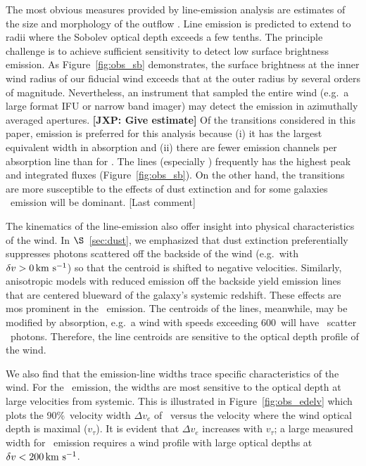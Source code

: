 \documentclass[12pt,preprint]{aastex}
\begin{document}
The most obvious measures provided by line-emission analysis are
estimates
of the size and morphology of the outflow \citep{rubin+10c}.  
Line emission is predicted to extend to radii where the Sobolev
optical depth exceeds a few tenths.  The principle
challenge is to achieve sufficient sensitivity to detect low
surface brightness emission. As Figure~\ref{fig:obs_sb}
demonstrates, the surface brightness at the inner wind radius of our
fiducial wind exceeds that at the outer radius by several orders of magnitude.
Nevertheless, an instrument that sampled the entire wind (e.g.\ a
large format IFU or narrow band imager) may detect the emission in
azimuthally averaged apertures. {\bf [JXP: Give estimate]}
Of the transitions considered in this paper,  emission is
preferred for this analysis because 
(i) it has the largest equivalent width in absorption and
(ii) there are fewer emission channels per absorption line than for
.  The  lines (especially \mgiib) frequently has the
highest peak and integrated fluxes (Figure~\ref{fig:obs_sb}).  
On the other hand, the  transitions are more susceptible to
the effects of dust extinction and for some galaxies \feiis\ emission
will be dominant.  [Last comment]

The kinematics of the line-emission also offer insight into physical
characteristics of the wind.
In $\S$~\ref{sec:dust}, we emphasized that dust extinction
preferentially suppresses photons scattered off the backside of the
wind (e.g.\ with $\delta v > 0 \, {\rm km~s^{-1}}$) so that the centroid is shifted to
negative velocities.  Similarly, anisotropic models with reduced
emission off the backside yield emission lines that are centered
blueward of the galaxy's systemic redshift.  These effects are mos
prominent in the \feiis\ emission.  The centroids of the 
lines, meanwhile, may be modified by absorption, e.g.\ a wind with
speeds exceeding 600\kms\ will have \mgiib\ scatter \mgiia\ photons.
Therefore, the line centroids are sensitive to the optical depth
profile of the wind.  

We also find that the emission-line widths trace specific
characteristics of the wind.  For the \feiis\ emission, the widths are
most sensitive to the optical depth at large velocities from
systemic.  This is illustrated in Figure~\ref{fig:obs_edelv} which plots
the 90\%\ velocity width $\Delta v_e$ of \feiic\ versus the velocity
where the wind optical depth is maximal ($v_\tau$).  It is evident
that $\Delta v_e$ increases with $v_\tau$; a large measured width for
\feiis\ emission requires a wind profile with large optical depths at
$\delta v < 200 \, {\rm km~s^{-1}}$.
\end{document}
